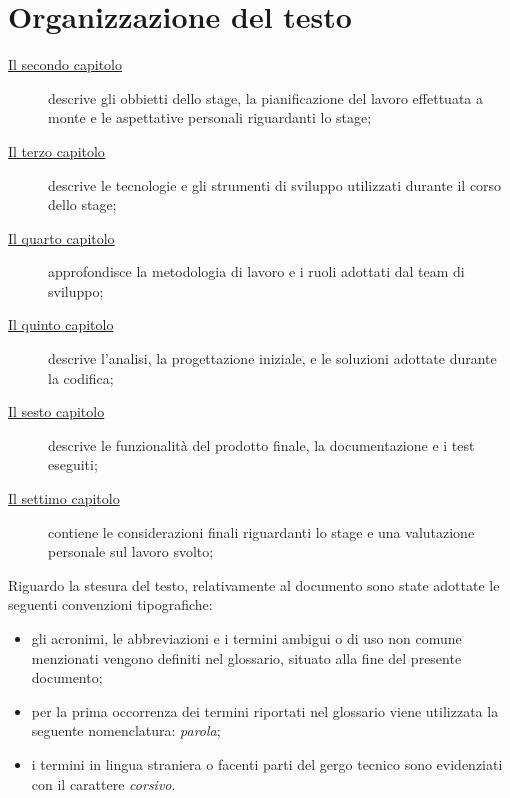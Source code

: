 \section{Organizzazione del testo}

\begin{description}
    \item[{\hyperref[cap:obbiettivi-pianificazione]{Il secondo capitolo}}] descrive gli obbietti dello stage, la pianificazione del lavoro effettuata a monte e le aspettative personali riguardanti lo stage;
    
    \item[{\hyperref[cap:tecnologie]{Il terzo capitolo}}] descrive le tecnologie e gli strumenti di sviluppo utilizzati durante il corso dello stage;
    
    \item[{\hyperref[cap:metodologia-lavoro]{Il quarto capitolo}}] approfondisce la metodologia di lavoro e i ruoli adottati dal team di sviluppo;
    
    \item[{\hyperref[cap:analisi]{Il quinto capitolo}}] descrive l'analisi, la progettazione iniziale, e le soluzioni adottate durante la codifica;
    
    \item[{\hyperref[cap:prodotto]{Il sesto capitolo}}] descrive le funzionalità del prodotto finale, la documentazione e i test eseguiti;
    
    \item[{\hyperref[cap:considerazioni]{Il settimo capitolo}}] contiene le considerazioni finali riguardanti lo stage e una valutazione personale sul lavoro svolto;

\end{description}

Riguardo la stesura del testo, relativamente al documento sono state adottate le seguenti convenzioni tipografiche:
\begin{itemize}
	\item gli acronimi, le abbreviazioni e i termini ambigui o di uso non comune menzionati vengono definiti nel glossario, situato alla fine del presente documento;
	\item per la prima occorrenza dei termini riportati nel glossario viene utilizzata la seguente nomenclatura: \emph{parola}\glsfirstoccur{};
	\item i termini in lingua straniera o facenti parti del gergo tecnico sono evidenziati con il carattere \emph{corsivo}.
\end{itemize}